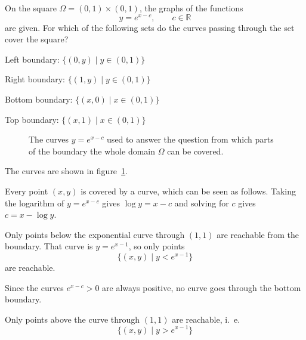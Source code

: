 On the square $\Omega = (0,1)\times (0,1)$, the graphs of the functions
\[
y = e^{x-c},\qquad c \in\mathbb{R}
\]
are given.
For which of the following sets do the curves passing through the set
cover the square?
\begin{teilaufgaben}
\item Left boundary: $\{(0,y)\mid y\in (0,1)\}$
\item Right boundary: $\{(1,y)\mid y\in (0,1)\}$
\item Bottom boundary: $\{(x,0)\mid x\in (0,1)\}$
\item Top boundary: $\{(x,1)\mid x\in (0,1)\}$
\end{teilaufgaben}

\begin{loesung}
\begin{figure}
\centering
{}
\caption{The curves $y=e^{x-c}$ used to answer the question
from which parts of the boundary the whole domain $\Omega$
can be covered.
\label{30000031:fig}}
\end{figure}
The curves are shown in figure~\ref{30000031:fig}.
\begin{teilaufgaben}
\item
Every point $(x,y)$ is covered by a curve, which can be seen as follows.
Taking the logarithm of $y=e^{x-c}$ gives $\log y = x-c$ and solving for
$c$ gives $c=x-\log y$.
\item
Only points below the exponential curve through $(1,1)$ are reachable
from the boundary.
That curve is $y=e^{x-1}$, so only points
\[
\{ (x,y) \mid y < e^{x-1} \}
\]
are reachable.
\item
Since the curves $e^{x-c}>0$ are always positive, no curve goes through
the bottom boundary.
\item
Only points above the curve through $(1,1)$ are reachable, i.~e.
\[
\{ (x,y) \mid y > e^{x-1} \}
\]
\end{teilaufgaben}
\end{loesung}
